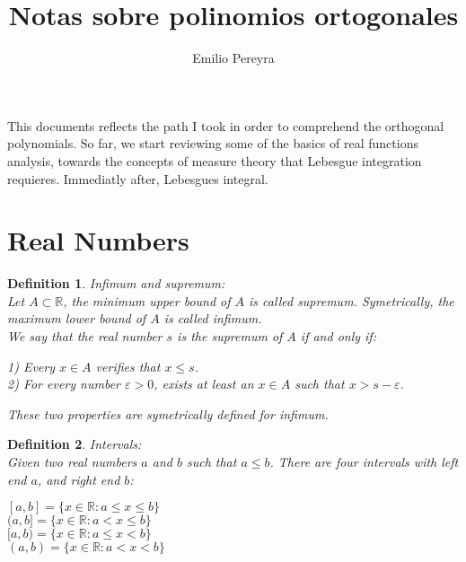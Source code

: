 \documentclass{article}
\title{Notas sobre polinomios ortogonales}
\author{Emilio Pereyra}
\newtheorem{definition}{Definition}[section]
\begin{document}
	\begin{titlepage}
	\maketitle
	This documents reflects the path I took in order to comprehend the orthogonal
	polynomials. So far, we start reviewing some of the basics of real functions
	analysis, towards the concepts of measure theory that Lebesgue integration requieres.
	Immediatly after, Lebesgues integral.

	\end{titlepage}
	\section{Real Numbers}
	\begin{definition}
		Infimum and supremum:\\
		Let $A \subset \mathbb{R}$, the minimum upper bound of $A$ is called supremum.
		Symetrically, the maximum lower bound of $A$ is called infimum.\\
	
		We say that the real number $s$ is the supremum of $A$ if and only if:\\
		\begin{flushleft}
		1) Every $x \in A$ verifies that  $x \leq s$.\\
		2) For every number $\varepsilon >  0$, exists at least an $x \in A$
		such that $x>s-\varepsilon$.\\
		\end{flushleft}

		These two properties are symetrically defined for infimum.
	\end{definition}

	\begin{definition}
		Intervals:\\
		Given two real numbers $a$ and $b$ such that  $ a \leq b$. There are four
		intervals with left end $a$, and right end $b$:
		\begin{center}
			$[a,b] = \{x \in \mathbb{R} : a \leq x \leq b \}$\\
		$(a,b] = \{x \in \mathbb{R} : a < x \leq b \}$\\
		$[a,b) = \{x \in \mathbb{R} : a \leq x < b \}$\\
		$(a,b) = \{x \in \mathbb{R} : a < x < b \}$\\
		\end{center}
	\end{definition}
\end{document}
